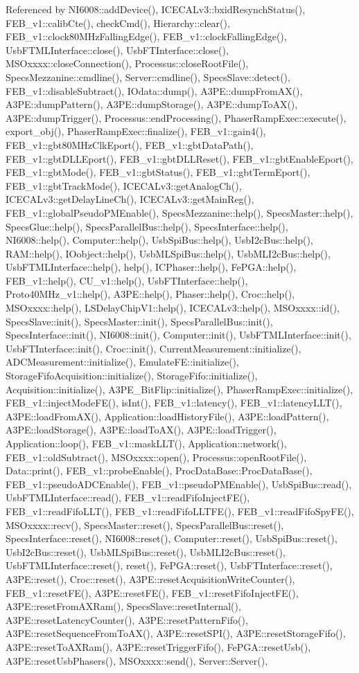 Referenced by NI6008::addDevice(), ICECALv3::bxidResynchStatus(), FEB\_\-v1::calibCte(), checkCmd(), Hierarchy::clear(), FEB\_\-v1::clock80MHzFallingEdge(), FEB\_\-v1::clockFallingEdge(), UsbFTMLInterface::close(), UsbFTInterface::close(), MSOxxxx::closeConnection(), Processus::closeRootFile(), SpecsMezzanine::cmdline(), Server::cmdline(), SpecsSlave::detect(), FEB\_\-v1::disableSubtract(), IOdata::dump(), A3PE::dumpFromAX(), A3PE::dumpPattern(), A3PE::dumpStorage(), A3PE::dumpToAX(), A3PE::dumpTrigger(), Processus::endProcessing(), PhaserRampExec::execute(), export\_\-obj(), PhaserRampExec::finalize(), FEB\_\-v1::gain4(), FEB\_\-v1::gbt80MHzClkEport(), FEB\_\-v1::gbtDataPath(), FEB\_\-v1::gbtDLLEport(), FEB\_\-v1::gbtDLLReset(), FEB\_\-v1::gbtEnableEport(), FEB\_\-v1::gbtMode(), FEB\_\-v1::gbtStatus(), FEB\_\-v1::gbtTermEport(), FEB\_\-v1::gbtTrackMode(), ICECALv3::getAnalogCh(), ICECALv3::getDelayLineCh(), ICECALv3::getMainReg(), FEB\_\-v1::globalPseudoPMEnable(), SpecsMezzanine::help(), SpecsMaster::help(), SpecsGlue::help(), SpecsParallelBus::help(), SpecsInterface::help(), NI6008::help(), Computer::help(), UsbSpiBus::help(), UsbI2cBus::help(), RAM::help(), IOobject::help(), UsbMLSpiBus::help(), UsbMLI2cBus::help(), UsbFTMLInterface::help(), help(), ICPhaser::help(), FePGA::help(), FEB\_\-v1::help(), CU\_\-v1::help(), UsbFTInterface::help(), Proto40MHz\_\-v1::help(), A3PE::help(), Phaser::help(), Croc::help(), MSOxxxx::help(), LSDelayChipV1::help(), ICECALv3::help(), MSOxxxx::id(), SpecsSlave::init(), SpecsMaster::init(), SpecsParallelBus::init(), SpecsInterface::init(), NI6008::init(), Computer::init(), UsbFTMLInterface::init(), UsbFTInterface::init(), Croc::init(), CurrentMeasurement::initialize(), ADCMeasurement::initialize(), EmulateFE::initialize(), StorageFifoAcquisition::initialize(), StorageFifo::initialize(), Acquisition::initialize(), A3PE\_\-BitFlip::initialize(), PhaserRampExec::initialize(), FEB\_\-v1::injectModeFE(), isInt(), FEB\_\-v1::latency(), FEB\_\-v1::latencyLLT(), A3PE::loadFromAX(), Application::loadHistoryFile(), A3PE::loadPattern(), A3PE::loadStorage(), A3PE::loadToAX(), A3PE::loadTrigger(), Application::loop(), FEB\_\-v1::maskLLT(), Application::network(), FEB\_\-v1::oldSubtract(), MSOxxxx::open(), Processus::openRootFile(), Data::print(), FEB\_\-v1::probeEnable(), ProcDataBase::ProcDataBase(), FEB\_\-v1::pseudoADCEnable(), FEB\_\-v1::pseudoPMEnable(), UsbSpiBus::read(), UsbFTMLInterface::read(), FEB\_\-v1::readFifoInjectFE(), FEB\_\-v1::readFifoLLT(), FEB\_\-v1::readFifoLLTFE(), FEB\_\-v1::readFifoSpyFE(), MSOxxxx::recv(), SpecsMaster::reset(), SpecsParallelBus::reset(), SpecsInterface::reset(), NI6008::reset(), Computer::reset(), UsbSpiBus::reset(), UsbI2cBus::reset(), UsbMLSpiBus::reset(), UsbMLI2cBus::reset(), UsbFTMLInterface::reset(), reset(), FePGA::reset(), UsbFTInterface::reset(), A3PE::reset(), Croc::reset(), A3PE::resetAcquisitionWriteCounter(), FEB\_\-v1::resetFE(), A3PE::resetFE(), FEB\_\-v1::resetFifoInjectFE(), A3PE::resetFromAXRam(), SpecsSlave::resetInternal(), A3PE::resetLatencyCounter(), A3PE::resetPatternFifo(), A3PE::resetSequenceFromToAX(), A3PE::resetSPI(), A3PE::resetStorageFifo(), A3PE::resetToAXRam(), A3PE::resetTriggerFifo(), FePGA::resetUsb(), A3PE::resetUsbPhasers(), MSOxxxx::send(), Server::Server(), 